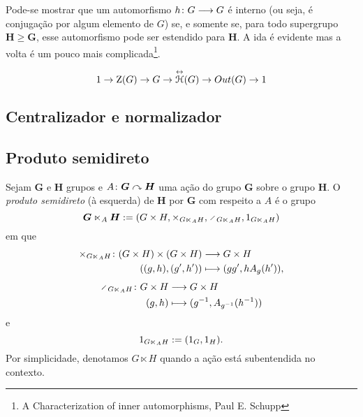 Pode-se mostrar que um automorfismo ${h}\colon {G} \longrightarrow {G}$ é interno (ou seja, é conjugação por algum elemento de $G$) se, e somente se, para todo supergrupo $\bm H \geq \bm G$, esse automorfismo pode ser estendido para $\bm H$. A ida é evidente mas a volta é um pouco mais complicada\footnote{A Characterization of inner automorphisms, Paul E. Schupp}.

	\begin{equation*}
		1 \to \operatorname{Z}(G) \to G \to \overset{\leftrightarrow}{\mathcal{H}}(G) \to Out(G) \to 1
	\end{equation*}


\subsection{Centralizador e normalizador}






\subsection{Produto semidireto}

\begin{definition}
Sejam $\bm G$ e $\bm H$ grupos e $A\colon \bm G \curvearrowright \bm H$ uma ação do grupo $\bm G$ sobre o grupo $\bm H$. O \emph{produto semidireto} (à esquerda) de $\bm H$ por $\bm G$ com respeito a $A$ é o grupo
	\begin{equation*}
		\bm G \ltimes_A \bm H := (G \times H,\times_{G \ltimes_A H},\div_{G \ltimes_A H},\id_{G \ltimes_A H})
	\end{equation*}
em que
	\begin{align*}
		{\times_{G \ltimes_A H}}\colon {(G \times H) \times (G \times H)} &\longrightarrow {G \times H} \\{((g,h),(g',h'))} &\longmapsto (gg',hA_g(h')),
	\end{align*}
	\begin{align*}
		\func{\div_{G \ltimes_A H}}{G \times H}{G \times H}{(g,h)}{(g\inv,A_{g\inv}(h\inv))}
	\end{align*}
e
	\begin{equation*}
		1_{G \ltimes_A H} := (1_G,1_H).
	\end{equation*}
Por simplicidade, denotamos $G \ltimes H$ quando a ação está subentendida no contexto.

\end{definition}

